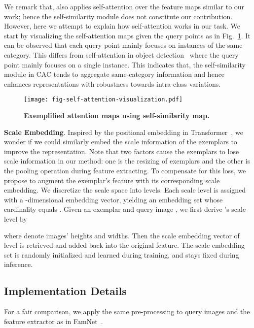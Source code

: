 \documentclass[10pt,twocolumn,letterpaper]{article}
\newcommand{\margin}{\vspace{3pt}\noindent}
\begin{document}
We remark that, \cite{cfocnet} also applies self-attention over the feature maps similar to our work; hence the self-similarity module does not constitute our contribution. However, here we attempt to explain how self-attention works in our task. We start by visualizing the self-attention maps given the query points as in Fig.~\ref{fig:self-attention-visualization}. It can be observed that each query point mainly focuses on instances of the same category. This differs from self-attention in object detection~\cite{detr} where the query point mainly focuses on a single instance. This indicates that, the self-similarity module in CAC tends to aggregate same-category information and hence enhances representations with robustness towards intra-class variations.

\begin{figure}[t]
  \centering
   \texttt{[image: fig-self-attention-visualization.pdf]}\vspace{-5pt}
   \caption{\textbf{Exemplified attention maps using self-similarity map.}}
   \label{fig:self-attention-visualization}
   \vspace{-5pt}
\end{figure}

\margin
\textbf{Scale Embedding}. 
Inspired by the positional embedding in Transformer~\cite{transformer}, we wonder if we could similarly embed the scale information of the exemplars to improve the representation. Note that two factors cause the exemplars to lose scale information in our method: one is the resizing of exemplars and the other is the pooling operation during feature extracting. 
To compensate for this loss, we propose to augment the exemplar's feature with its corresponding scale embedding. We discretize the scale space into  levels. Each scale level is assigned with a -dimensional embedding vector, yielding an embedding set whose cardinality equals . Given an exemplar  and query image , we first derive 's scale level  by

where  denote images' heights and widths. Then the scale embedding vector of level  is retrieved and added back into the original feature. The scale embedding set is randomly initialized and learned during training, and stays fixed during inference. 





\subsection{Implementation Details}
For a fair comparison, we apply the same pre-processing to query images and the feature extractor as in FamNet~\cite{famnet}.
\end{document}
